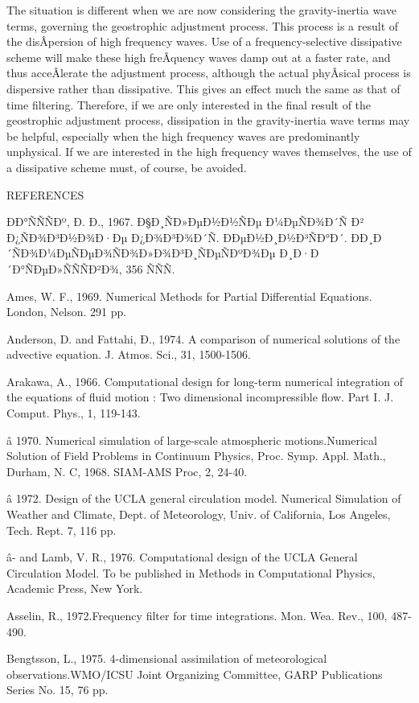 The situation is different when we are now considering the
gravity-inertia wave terms, governing the geostrophic adjustment
process. This process is a result of the disÂ­persion of high frequency
waves. Use of a frequency-selective dissipative scheme will make these
high freÂ­quency waves damp out at a faster rate, and thus acceÂ­lerate
the adjustment process, although the actual phyÂ­sical process is
dispersive rather than dissipative. This gives an effect much the same
as that of time filtering. Therefore, if we are only interested in the
final result of the geostrophic adjustment process, dissipation in the
gravity-inertia wave terms may be helpful, especially when the high
frequency waves are predominantly unphysical. If we are interested in
the high frequency waves themselves, the use of a dissipative scheme
must, of course, be avoided.

REFERENCES

ÐÐ°ÑÑÑÐº, Ð. Ð., 1967. Ð§Ð¸ÑÐ»ÐµÐ½Ð½ÑÐµ Ð¼ÐµÑÐ¾Ð´Ñ Ð² Ð¿ÑÐ¾Ð³Ð½Ð¾Ð·Ðµ
Ð¿Ð¾Ð³Ð¾Ð´Ñ. ÐÐµÐ½Ð¸Ð½Ð³ÑÐ°Ð´. ÐÐ¸Ð´ÑÐ¾Ð¼ÐµÑÐµÐ¾ÑÐ¾Ð»Ð¾Ð³Ð¸ÑÐµÑÐºÐ¾Ðµ
Ð¸Ð·Ð´Ð°ÑÐµÐ»ÑÑÑÐ²Ð¾, 356 ÑÑÑ.

Ames, W. F., 1969. Numerical Methods for Partial Differential Equations.
London, Nelson. 291 pp.

Anderson, D. and Fattahi, Ð., 1974. A comparison of numerical solutions
of the advective equation. J. Atmos. Sci., 31, 1500-1506.

Arakawa, A., 1966. Computational design for long-term numerical
integration of the equations of fluid motion : Two dimensional
incompressible flow. Part I. J. Comput. Phys., 1, 119-143.

â 1970. Numerical simulation of large-scale atmospheric
motions.Numerical Solution of Field Problems in Continuum Physics, Proc.
Symp. Appl. Math., Durham, N. C, 1968. SIAM-AMS Proc, 2, 24-40.

â 1972. Design of the UCLA general circulation model. Numerical
Simulation of Weather and Climate, Dept. of Meteorology, Univ. of
California, Los Angeles, Tech. Rept. 7, 116 pp.

â- and Lamb, V. R., 1976. Computational design of the UCLA General
Circulation Model. To be published in Methods in Computational Physics,
Academic Press, New York.

Asselin, R., 1972.Frequency filter for time integrations. Mon. Wea.
Rev., 100, 487-490.

Bengtsson, L., 1975. 4-dimensional assimilation of meteorological
observations.WMO/ICSU Joint Organizing Committee, GARP Publications
Series No. 15, 76 pp.

